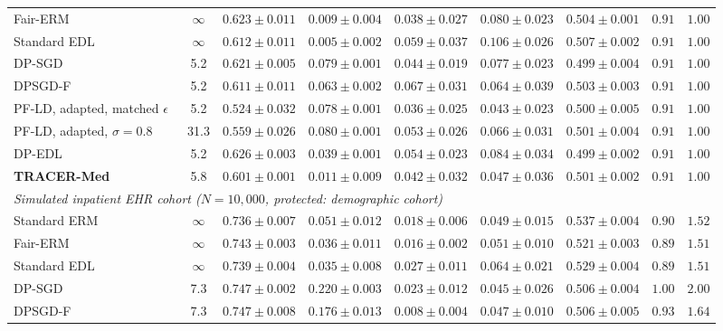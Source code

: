 \documentclass[3p,12pt]{elsarticle}
\theoremstyle{plain}
\theoremstyle{definition}
\begin{document}
\begin{table}[t]
{\begin{tabular}{lcccccccc}
Fair-ERM & $\infty$ & $0.623 \pm 0.011$ & $0.009 \pm 0.004$ & $0.038 \pm 0.027$ & $0.080 \pm 0.023$ & $0.504 \pm 0.001$ & $0.91$ & $1.00$ \\
Standard EDL & $\infty$ & $0.612 \pm 0.011$ & $0.005 \pm 0.002$ & $0.059 \pm 0.037$ & $0.106 \pm 0.026$ & $0.507 \pm 0.002$ & $0.91$ & $1.00$ \\
DP-SGD & 5.2 & $0.621 \pm 0.005$ & $0.079 \pm 0.001$ & $0.044 \pm 0.019$ & $0.077 \pm 0.023$ & $0.499 \pm 0.004$ & $0.91$ & $1.00$ \\
DPSGD-F~\cite{xu2021removing} & 5.2 & $0.611 \pm 0.011$ & $0.063 \pm 0.002$ & $0.067 \pm 0.031$ & $0.064 \pm 0.039$ & $0.503 \pm 0.003$ & $0.91$ & $1.00$ \\
PF-LD, adapted, matched $\epsilon$~\cite{tran2021differentially} & 5.2 & $0.524 \pm 0.032$ & $0.078 \pm 0.001$ & $\mathbf{0.036} \pm \mathbf{0.025}$ & $\mathbf{0.043} \pm \mathbf{0.023}$ & $0.500 \pm 0.005$ & $0.91$ & $1.00$ \\
PF-LD, adapted, $\sigma=0.8$~\cite{tran2021differentially} & 31.3 & $0.559 \pm 0.026$ & $0.080 \pm 0.001$ & $0.053 \pm 0.026$ & $0.066 \pm 0.031$ & $0.501 \pm 0.004$ & $0.91$ & $1.00$ \\
DP-EDL & 5.2 & $\mathbf{0.626} \pm \mathbf{0.003}$ & $0.039 \pm 0.001$ & $0.054 \pm 0.023$ & $0.084 \pm 0.034$ & $\mathbf{0.499} \pm \mathbf{0.002}$ & $0.91$ & $1.00$ \\
\textbf{TRACER-Med} & 5.8 & $0.601 \pm 0.001$ & $\mathbf{0.011} \pm \mathbf{0.009}$ & $0.042 \pm 0.032$ & $0.047 \pm 0.036$ & $0.501 \pm 0.002$ & $0.91$ & $1.00$ \\
\midrule
\multicolumn{9}{l}{\emph{Simulated inpatient EHR cohort ($N=10{,}000$, protected: demographic cohort)}} \\
Standard ERM & $\infty$ & $0.736 \pm 0.007$ & $0.051 \pm 0.012$ & $0.018 \pm 0.006$ & $0.049 \pm 0.015$ & $0.537 \pm 0.004$ & $0.90$ & $1.52$ \\
Fair-ERM & $\infty$ & $0.743 \pm 0.003$ & $0.036 \pm 0.011$ & $0.016 \pm 0.002$ & $0.051 \pm 0.010$ & $0.521 \pm 0.003$ & $0.89$ & $1.51$ \\
Standard EDL & $\infty$ & $0.739 \pm 0.004$ & $0.035 \pm 0.008$ & $0.027 \pm 0.011$ & $0.064 \pm 0.021$ & $0.529 \pm 0.004$ & $0.89$ & $1.51$ \\
DP-SGD & 7.3 & $0.747 \pm 0.002$ & $0.220 \pm 0.003$ & $0.023 \pm 0.012$ & $0.045 \pm 0.026$ & $0.506 \pm 0.004$ & $1.00$ & $2.00$ \\
DPSGD-F~\cite{xu2021removing} & 7.3 & $0.747 \pm 0.008$ & $0.176 \pm 0.013$ & $0.008 \pm 0.004$ & $0.047 \pm 0.010$ & $0.506 \pm 0.005$ & $0.93$ & $1.64$ \\

\end{tabular}}
\end{table}
\end{document}
